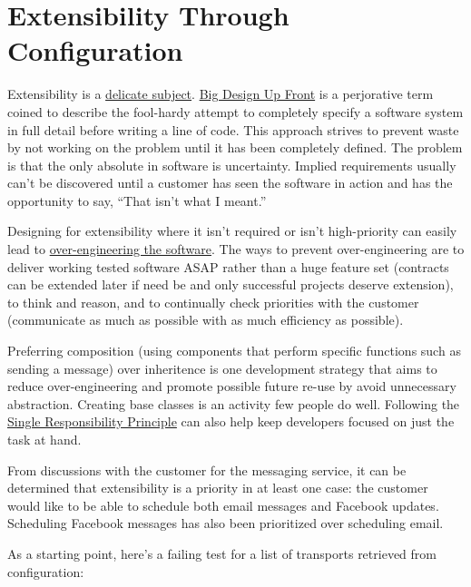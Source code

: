 
\chapter{Extensibility Through Configuration}

Extensibility is a \href{http://webarya.wordpress.com/2010/05/28/my-ten-development-principles/}{delicate subject}. \href{http://c2.com/xp/BigDesignUpFront.html}{Big Design Up Front} is a perjorative term coined to describe the fool-hardy attempt to completely specify a software system in full detail before writing a line of code. This approach strives to prevent waste by not working on the problem until it has been completely defined. The problem is that the only absolute in software is uncertainty. Implied requirements usually can't be discovered until a customer has seen the software in action and has the opportunity to say, ``That isn't what I meant.'' 

Designing for extensibility where it isn't required or isn't high-priority can easily lead to \href{http://blog.digitalstruct.com/2008/02/17/over-engineering-software/}{over-engineering the software}. The ways to prevent over-engineering are to deliver working tested software ASAP rather than a huge feature set (contracts can be extended later if need be and only successful projects deserve extension), to think and reason, and to continually check priorities with the customer (communicate as much as possible with as much efficiency as possible).

Preferring composition (using components that perform specific functions such as sending a message) over inheritence is one development strategy that aims to reduce over-engineering and promote possible future re-use by avoid unnecessary abstraction. Creating base classes is an activity few people do well. Following the \href{http://www.objectmentor.com/resources/articles/srp.pdf}{Single Responsibility Principle} can also help keep developers focused on just the task at hand.

From discussions with the customer for the messaging service, it can be determined that extensibility is a priority in at least one case: the customer would like to be able to schedule both email messages and Facebook updates. Scheduling Facebook messages has also been prioritized over scheduling email.

As a starting point, here's a failing test for a list of transports retrieved from configuration:

